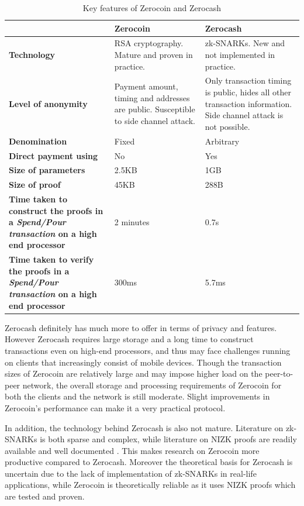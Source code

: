 \begin{table}[H]
	\centering \small
	\begin{tabular}{ p{5.5cm} | p{4.25cm} | p{4.25cm} }
		
		& \textbf{Zerocoin} & \textbf{Zerocash} \\ 		
		\hline
		\hline
		\textbf{Technology} & 
		RSA cryptography. Mature and proven in practice. & 
		zk-SNARKs. New and not implemented in practice. \\	
		\hline
		\textbf{Level of anonymity} & Payment amount, timing and addresses are public. Susceptible to side channel attack. & Only transaction timing is public, hides all other transaction information. Side channel attack is not possible. \\
		\hline
		\textbf{Denomination} & Fixed & Arbitrary \\ 
		\hline
		\textbf{Direct payment using \kwCoin{s}} & No & Yes \\
		\hline
		\textbf{Size of parameters} & 2.5KB & 1GB \\	
		\hline
		\textbf{Size of proof} & 45KB & 288B \\
		\hline
		\textbf{Time taken to construct the proofs in a \textit{Spend/Pour transaction }on a high end processor} & 2 minutes & 0.7s \\
		\hline
		\textbf{Time taken to verify the proofs in a \textit{Spend/Pour transaction} on a high end processor} & 300ms & 5.7ms \\
		
	\end{tabular}
	\caption{Key features of Zerocoin and Zerocash}
	\label{tab:zerocash_zerocoin_keyfeatures}
\end{table}


Zerocash definitely has much more to offer in terms of privacy and features. However Zerocash requires large storage and a long time to construct transactions even on high-end processors, and thus may face challenges running on clients that increasingly consist of mobile devices. Though the transaction sizes of Zerocoin are relatively large and may impose higher load on the peer-to-peer network, the overall storage and processing requirements of Zerocoin for both the clients and the network is still moderate. Slight improvements in Zerocoin’s performance can make it a very practical protocol. 

In addition, the technology behind Zerocash is also not mature. Literature on zk-SNARKs is both sparse and complex, while literature on NIZK proofs are readily available and well documented \cite{Zcoin2016}. This makes research on Zerocoin more productive compared to Zerocash. Moreover the theoretical basis for Zerocash is uncertain due to the lack of implementation of zk-SNARKs in real-life applications, while Zerocoin is theoretically reliable as it uses NIZK proofs which are tested and proven. 

